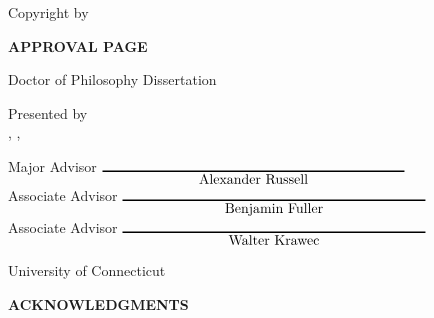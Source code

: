 \pagestyle{plain}
\setcounter{page}{2} %
\phantom{skip}
\vspace{.5in}
\begin{center}
Copyright by

\vspace{1in}
\myname

\vspace{4.5in}
\myyear
\end{center}
\newpage


\begin{center}
{\large\bf APPROVAL PAGE}

\vspace{.5in}
Doctor of Philosophy Dissertation

\vspace{.5in}
{\LARGE\bf\mythesistitle}

\vspace{.5in}
Presented by\\
\myname, \degreeoneshort, \degreetwoshort
\vspace{.75in}
\end{center}

\begin{center}
\begin{minipage}{4.5in}
Major Advisor \hfill$\underset{\hbox{\majoradvisor}}{\rule{3in}{1pt}}$\\[15pt]

Associate Advisor \hfill$\underset{\hbox{\associateone}}{\rule{3in}{1pt}}$\\[15pt]

Associate Advisor \hfill$\underset{\hbox{\associatetwo}}{\rule{3in}{1pt}}$
\end{minipage}

\vspace{1in}
University of Connecticut\\
\myyear
\end{center}


\newpage

\thispagestyle{plain}

\begin{center}
{\large\bf ACKNOWLEDGMENTS}
\vspace{1in}
\end{center}

